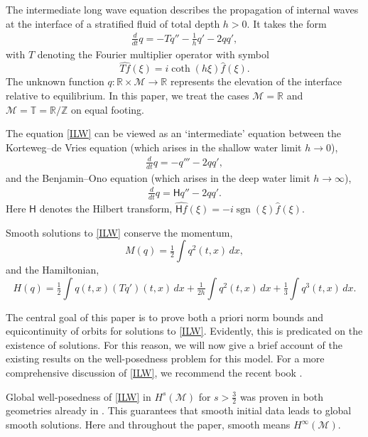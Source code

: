 \documentclass{amsart}
\newcommand{\R}{{\mathbb{R}}}
\newcommand{\T}{{\mathbb{T}}}
\newcommand{\Z}{{\mathbb{Z}}}
\DeclareMathOperator{\sgn}{sgn}
\newcommand{\HH}{\mathsf{H}}
\theoremstyle{definition}
\theoremstyle{remark}
\begin{document}
The intermediate long wave equation describes the propagation of internal waves at the interface of a stratified fluid of total depth $h>0$.  It takes the form
\begin{align}\tag{ILW}\label{ILW}
\tfrac{d}{dt}q = - Tq'' - \tfrac1h q' -2qq',
\end{align}
with $T$ denoting the  Fourier multiplier operator with symbol
\begin{equation}\label{T defn}
\widehat {Tf}(\xi) = i\coth(h\xi) \widehat f(\xi).
\end{equation}
The unknown function $q:\R\times\mathcal M\to \R$ represents the elevation of the interface relative to equilibrium.  In this paper, we treat the cases $\mathcal M =\R$ and $\mathcal M =\T=\R/\Z$ on equal footing.

The equation \eqref{ILW} can be viewed as an `intermediate' equation between the Korteweg--de Vries equation (which arises in the shallow water limit $h\to 0$),
\begin{align}\tag{KdV}\label{KdV}
\tfrac{d}{dt}q = -q''' - 2qq',
\end{align}
and the Benjamin--Ono equation (which arises in the deep water limit $h\to \infty$),
\begin{align}\tag{BO}\label{BO}
\tfrac{d}{dt}q = \HH q'' -2qq'.
\end{align}
Here $\HH$ denotes the Hilbert transform, $\widehat {\HH f}(\xi) = -i\sgn(\xi) \widehat f(\xi)$.

Smooth solutions to \eqref{ILW} conserve the momentum,
\begin{equation}\label{moment}
M(q) = \tfrac12 \int q^2(t,x)\, dx,
\end{equation}
and the Hamiltonian,
\begin{equation}
H(q) = \tfrac12 \int q(t,x) (Tq')(t,x) \, dx + \tfrac1{2h} \int q^2(t,x) \, dx + \tfrac13 \int q^3(t,x)\, dx. 
\end{equation}

The central goal of this paper is to prove both a priori norm bounds and equicontinuity of orbits for solutions to \eqref{ILW}.  Evidently, this is predicated on the existence of solutions.  For this reason, we will now give a brief account of the existing results on the well-posedness problem for this model.   For a more comprehensive discussion of \eqref{ILW}, we recommend the recent book \cite{KSbook}.  

Global well-posedness of \eqref{ILW} in $H^{s}(\mathcal M)$ for $s>\frac32$ was proven in both geometries already in \cite{ABFS}.  This guarantees that smooth initial data leads to global smooth solutions.   Here and throughout the paper, smooth means $H^\infty(\mathcal M)$. 
\end{document}
